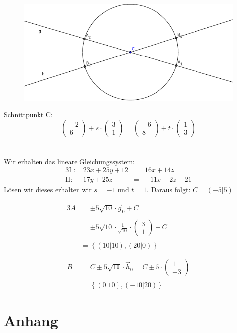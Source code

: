 \documentclass[12pt,a4paper]{scrbook}
\begin{document}
\begin{figure}[h]
	\centering
	\includegraphics[scale=1.2]{img/parameter_geometrie.pdf}\\
\end{figure}

Schnittpunkt C:\\
\[ \left(\begin{array}{c}-2\\6\end{array}\right) + s \cdot \left(\begin{array}{c}3\\1\end{array}\right) = \left(\begin{array}{c}-6\\8\end{array}\right) + t \cdot \left(\begin{array}{c}1\\3\end{array}\right)\]\\
\\
Wir erhalten das lineare Gleichungssystem:
\begin{alignat}{3}
\text{I :  } & 23x+25y+12 & = & 16x + 14z \nonumber \\
\text{II:  } & 17y+25z & = & -11x + 2z - 21 \nonumber
\end{alignat}
Lösen wir dieses erhalten wir $s=-1$ und $t=1$. Daraus folgt: $C = (-5 \vert 5)$

\begin{alignat}{3}
A & = \pm 5 \sqrt{10} \cdot \vec{g}_0 + C \nonumber\\ \nonumber\\
  & = \pm 5 \sqrt{10} \cdot \frac{1}{\sqrt{10}} \cdot \left(\begin{array}{c}3\\1\end{array}\right) + C \nonumber \\ \nonumber\\
  & = \left\{(10 \vert 10), (20 \vert 0) \right\} \nonumber \nonumber\\ \nonumber\\ \nonumber\\
B & = C \pm 5 \sqrt{10} \cdot \vec{h}_0 = C \pm 5 \cdot \left(\begin{array}{c}1\\-3\end{array}\right) \nonumber\\ \nonumber\\
  & = \left\{ (0 \vert 10), (-10 \vert 20) \right\} \nonumber
\end{alignat}


\part{Anhang}
\listoffigures
\end{document}
